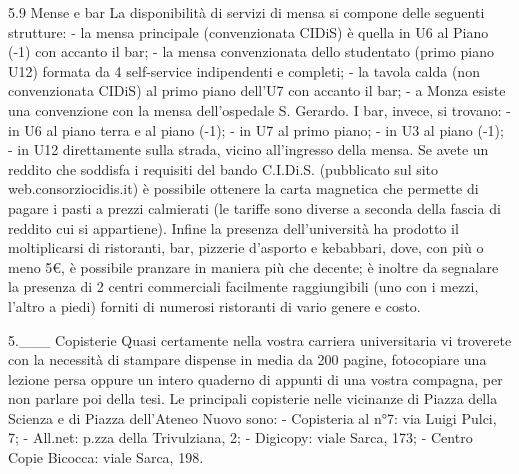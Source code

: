 5.9 Mense e bar
La disponibilità di servizi di mensa si compone delle seguenti strutture:
- la mensa principale (convenzionata CIDiS) è quella in U6 al Piano (-1) con accanto il bar;
- la mensa convenzionata dello studentato (primo piano U12) formata da 4 self-service indipendenti e completi;
- la tavola calda (non convenzionata CIDiS) al primo piano dell'U7 con accanto il bar;
- a Monza esiste una convenzione con la mensa dell'ospedale S. Gerardo.
I bar, invece, si trovano:
- in U6 al piano terra e al piano (-1);
- in U7 al primo piano;
- in U3 al piano (-1);
- in U12 direttamente sulla strada, vicino all'ingresso della mensa.
Se avete un reddito che soddisfa i requisiti del bando C.I.Di.S. (pubblicato sul sito web.consorziocidis.it) è possibile ottenere la carta magnetica che permette di pagare i pasti a prezzi calmierati (le tariffe sono diverse a seconda della fascia di reddito cui si appartiene).
Infine la presenza dell'università ha prodotto il moltiplicarsi di ristoranti, bar, pizzerie d'asporto e kebabbari, dove, con più o meno 5€, è possibile pranzare in maniera più che decente; è inoltre da segnalare la presenza di 2 centri commerciali facilmente raggiungibili (uno con i mezzi, l'altro a piedi) forniti di numerosi ristoranti di vario genere e costo.

5.___ Copisterie
Quasi certamente nella vostra carriera universitaria vi troverete con la necessità di stampare dispense in media da 200 pagine, fotocopiare una lezione persa oppure un intero quaderno di appunti di una vostra compagna, per non parlare poi della tesi. Le principali copisterie nelle vicinanze di Piazza della Scienza e di Piazza dell'Ateneo Nuovo sono:
- Copisteria al n°7: via Luigi Pulci, 7;
- All.net: p.zza della Trivulziana, 2;
- Digicopy: viale Sarca, 173;
- Centro Copie Bicocca: viale Sarca, 198.
